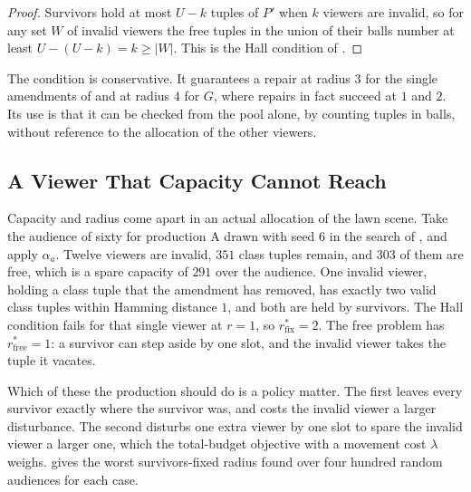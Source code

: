 \documentclass[11pt,twoside,openright]{book}
\theoremstyle{plain}
\theoremstyle{definition}
\theoremstyle{remark}
\begin{document}
\begin{proof}
Survivors hold at most $U-k$ tuples of $P'$ when $k$ viewers are invalid, so for any set $W$ of invalid viewers the free tuples in the union of their balls number at least $U-(U-k)=k\ge\lvert W\rvert$. This is the Hall condition of .
\end{proof}

The condition is conservative. It guarantees a repair at radius $3$ for the single amendments of  and at radius $4$ for $G$, where repairs in fact succeed at $1$ and $2$. Its use is that it can be checked from the pool alone, by counting tuples in balls, without reference to the allocation of the other viewers.

\subsection{A Viewer That Capacity Cannot Reach}

Capacity and radius come apart in an actual allocation of the lawn scene. Take the audience of sixty for production A drawn with seed $6$ in the search of , and apply $\alpha_a$. Twelve viewers are invalid, $351$ class tuples remain, and $303$ of them are free, which is a spare capacity of $291$ over the audience. One invalid viewer, holding a class tuple that the amendment has removed, has exactly two valid class tuples within Hamming distance $1$, and both are held by survivors. The Hall condition fails for that single viewer at $r=1$, so $r^\ast_{\mathrm{fix}}=2$. The free problem has $r^\ast_{\mathrm{free}}=1$: a survivor can step aside by one slot, and the invalid viewer takes the tuple it vacates.

Which of these the production should do is a policy matter. The first leaves every survivor exactly where the survivor was, and costs the invalid viewer a larger disturbance. The second disturbs one extra viewer by one slot to spare the invalid viewer a larger one, which the total-budget objective with a movement cost $\lambda$ weighs.  gives the worst survivors-fixed radius found over four hundred random audiences for each case.
\end{document}
